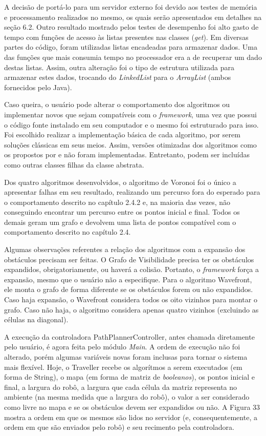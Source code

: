A decisão de portá-lo para um servidor externo foi devido aos testes de memória e processamento realizados no mesmo, os quais serão apresentados em detalhes na seção 6.2. Outro resultado mostrado pelos testes de desempenho foi alto gasto de tempo com funções de acesso às listas presentes nas classes (\textit{get}). Em diversas partes do código, foram utilizadas listas encadeadas para armazenar dados. Uma das funções que mais consumia tempo no processador era a de recuperar um dado destas listas. Assim, outra alteração foi o tipo de estrutura utilizada para armazenar estes dados, trocando do \textit{LinkedList} para o \textit{ArrayList} (ambos fornecidos pelo Java).

Caso queira, o usuário pode alterar o comportamento dos algoritmos ou implementar novos que sejam compatíveis com o \textit{framework}, uma vez que possui o código fonte instalado em seu computador e o mesmo foi estruturado para isso. Foi escolhido realizar a implementação básica de cada algoritmo, por serem soluções clássicas em seus meios. Assim, versões otimizadas dos algoritmos como os propostos por \cite{Souza2008} e \cite{Medeiros2011} não foram implementadas. Entretanto, podem ser incluídas como outras classes filhas da classe abstrata.

Dos quatro algoritmos desenvolvidos, o algoritmo de Voronoi foi o único a apresentar falhas em seu resultado, realizando um percurso fora do esperado para o comportamento descrito no capítulo 2.4.2 e, na maioria das vezes, não conseguindo encontrar um percurso entre os pontos inicial e final. Todos os demais geram um grafo e devolvem uma lista de pontos compatível com o comportamento descrito no capítulo 2.4.

Algumas observações referentes a relação dos algoritmos com a expansão dos obstáculos precisam ser feitas. O Grafo de Visibilidade precisa ter os obstáculos expandidos, obrigatoriamente, ou haverá a colisão. Portanto, o \textit{framework} força a expansão, mesmo que o usuário não a especifique. Para o algoritmo Wavefront, ele monta o grafo de forma diferente se os obstáculos forem ou não expandidos. Caso haja expansão, o Wavefront considera todos os oito vizinhos para montar o grafo. Caso não haja, o algoritmo considera apenas quatro vizinhos (excluindo as células na diagonal).

A execução da controladora PathPlannerController, antes chamada diretamente pelo usuário, é agora feita pelo módulo \textit{Main}. A ordem de execução não foi alterado, porém algumas variáveis novas foram inclusas para tornar o sistema mais flexível. Hoje, o Traveller recebe os algorítmos a serem executados (em forma de String), o mapa (em forma de matriz de \textit{booleanos}), os pontos inicial e final, a largura do robô, a largura que cada célula da matriz representa no ambiente (na mesma medida que a largura do robô), o valor a ser considerado como livre no mapa e se os obstáculos devem ser expandidos ou não. A Figura 33 mostra a ordem em que os mesmos são lidos no servidor (e, consequentemente, a ordem em que são enviados pelo robô) e seu recimento pela controladora.

